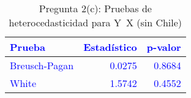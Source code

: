 \begin{table}[H]
\centering
\caption{Pregunta 2(c): Pruebas de heterocedasticidad para Y~X (sin Chile)}
\label{tab:q2c_hetero}
\begin{tabular}{lrr}
\rowcolor{blue!10}
\toprule
\rowcolor{blue!20}
\textcolor{blue}{\textbf{Prueba}} & \textcolor{blue}{\textbf{Estadístico}} & \textcolor{blue}{\textbf{p-valor}} \\
\midrule
\rowcolor{blue!10}
\textcolor{blue}{Breusch-Pagan} & \textcolor{blue}{0.0275} & \textcolor{blue}{0.8684} \\
\rowcolor{blue!10}
\textcolor{blue}{White} & \textcolor{blue}{1.5742} & \textcolor{blue}{0.4552} \\
\bottomrule
\end{tabular}
\end{table}
